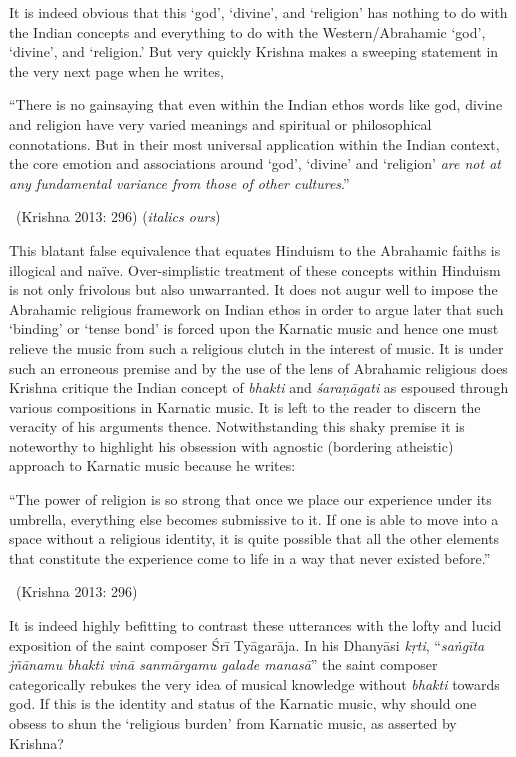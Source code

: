 It is indeed obvious that this ‘god’, ‘divine’, and ‘religion’ has nothing to do with the Indian concepts and everything to do with the Western/Abrahamic ‘god’, ‘divine’, and ‘religion.’ But very quickly Krishna makes a sweeping statement in the very next page when he writes,

\begin{myquote}
“There is no gainsaying that even within the Indian ethos words like god, divine and religion have very varied meanings and spiritual or philosophical connotations. But in their most universal application within the Indian context, the core emotion and associations around ‘god’, ‘divine’ and ‘religion’ \textit{are not at any fundamental variance from those of other cultures}.” 

~\hfill (Krishna 2013: 296) (\textit{italics ours})
\end{myquote}

This blatant false equivalence that equates Hinduism to the Abrahamic faiths is illogical and naïve. Over-simplistic treatment of these concepts within Hinduism is not only frivolous but also unwarranted. It does not augur well to impose the Abrahamic religious framework on Indian ethos in order to argue later that such ‘binding’ or ‘tense bond’ is forced upon the Karnatic music and hence one must relieve the music from such a religious clutch in the interest of music. It is under such an erroneous premise and by the use of the lens of Abrahamic religious does Krishna critique the Indian concept of \textit{bhakti} and \textit{śaraṇāgati }as espoused through various compositions in Karnatic music. It is left to the reader to discern the veracity of his arguments thence. Notwithstanding this shaky premise it is noteworthy to highlight his obsession with agnostic (bordering atheistic) approach to Karnatic music because he writes:

\begin{myquote}
“The power of religion is so strong that once we place our experience under its umbrella, everything else becomes submissive to it. If one is able to move into a space without a religious identity, it is quite possible that all the other elements that constitute the experience come to life in a way that never existed before.” 

~\hfill (Krishna 2013: 296)
\end{myquote}

It is indeed highly befitting to contrast these utterances with the lofty and lucid exposition of the saint composer Śrī Tyāgarāja. In his Dhanyāsi\textit{ kṛti}, “\textit{saṅgīta jñānamu bhakti vinā sanmārgamu galade manasā}” the saint composer categorically rebukes the very idea of musical knowledge without \textit{bhakti} towards god. If this is the identity and status of the Karnatic music, why should one obsess to shun the ‘religious burden’ from Karnatic music, as asserted by Krishna?

